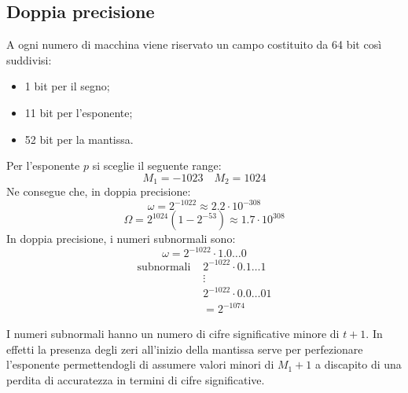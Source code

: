 \documentclass[12pt]{report}
\begin{document}
\subsection{Doppia precisione}
A ogni numero di macchina viene riservato un campo costituito da 64 bit così suddivisi:
\begin{itemize}
	\item 1 bit per il segno;
	\item 11 bit per l'esponente;
	\item 52 bit per la mantissa.
\end{itemize}
Per l'esponente $p$ si sceglie il seguente range:
\[
M_1 = -1023 \quad M_2 = 1024
\]
Ne consegue che, in doppia precisione:
\[
\omega = 2^{-1022} \approx 2.2 \cdot 10^{-308}
\]
\[
\Omega = 2^{1024}(1 - 2^{-53}) \approx 1.7\cdot 10^{308}
\]
In doppia precisione, i numeri subnormali sono:
\[
\omega = 2^{-1022}\cdot 1.0\dots0
\]
\begin{align*}
\text{subnormali } & 2^{-1022} \cdot 0.1\dots 1 \\
& \vdots \\
& 2^{-1022}\cdot 0.0\dots01 \\
&= 2^{-1074}
\end{align*}
\begin{note}{}{}
	I numeri subnormali hanno un numero di cifre significative minore di $t + 1$. In effetti la presenza degli zeri all'inizio della mantissa serve per perfezionare l'esponente permettendogli di assumere valori minori di $M_1 + 1$ a discapito di una perdita di accuratezza in termini di cifre significative.
\end{note}
\end{document}
